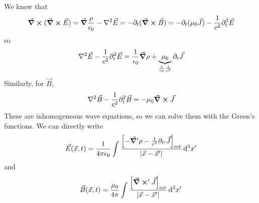 \documentclass[a4paper,twoside,master.tex]{subfiles}
\begin{document}
We know that
\begin{equation}
    \curl{(\curl{ \vec{E}})} = \grad{\frac{\rho}{\epsilon_0}} - \laplacian{ \vec{E}} = - \partial_t (\curl{ \vec{B}}) = -\partial_t(\mu_0 \vec{J}) - \frac{1}{c^2} \partial_t^2 \vec{E}
\end{equation}
so
\begin{equation}
    \laplacian{ \vec{E}} - \frac{1}{c^2} \partial_t^2 \vec{E} = \frac{1}{\epsilon_0} \grad{\rho} + \underbrace{\mu_0}_{\frac{1}{\epsilon_0} \frac{1}{c^2}} \partial_t \vec{J}
\end{equation}
Similarly, for $ \vec{B} $,
\begin{equation}
    \laplacian{ \vec{B}} - \frac{1}{c^2} \partial_t^2 \vec{B} = - \mu_0 \curl{ \vec{J}}
\end{equation}
These are inhomogeneous wave equations, so we can solve them with the Green's functions. We can directly write
\begin{equation}
    \vec{E}( \vec{x},t) = \frac{1}{4 \pi \epsilon_0} \int \frac{\left[ - \grad'{\rho} - \frac{1}{c^2} \partial_{t'} \vec{J} \right]_{\text{ret}}}{\abs{ \vec{x} - \vec{x}'}} \dd[3]{x'}
\end{equation}
and
\begin{equation}
    \vec{B}( \vec{x}, t) = \frac{\mu_0}{4 \pi} \int \frac{\left[ \curl'{ \vec{J}} \right]_{\text{ret}}}{\abs{ \vec{x} - \vec{x}'}} \dd[3]{x'}
\end{equation}
\end{document}
